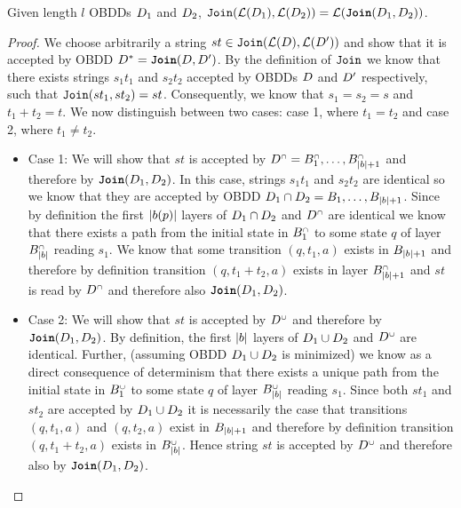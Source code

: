 \begin{lemma}
\label{lemma:SymbolicJoin}
Given length $l$ OBDDs $D_1$ and $D_2$, $\texttt{Join}(\mathcal{L}(D_1),\mathcal{L}(D_2)) = \mathcal{L}(\texttt{\textbf{Join}}(D_1,D_2))$.
\end{lemma}

\begin{proof}
    We choose arbitrarily a  string $st \in \texttt{Join}(\mathcal{L}(D),\mathcal{L}(D'))$ and show that it is accepted by OBDD $D^* = \texttt{\textbf{Join}}(D,D')$.
    By the definition of $\texttt{Join}$ we know that there exists strings $s_1t_1$ and $s_2t_2$ accepted by OBDDs $D$ and $D'$ respectively, such that $\texttt{Join}(st_1,st_2) = st$. Consequently, we know that $s_1 = s_2 = s$ and $t_1 +t_2 = t$. We now distinguish between two cases: case 1, where $t_1 = t_2$ and case 2, where $t_1 \neq t_2$.
    \begin{itemize}
        \item Case 1: We will show that $st$ is accepted by $D^{\scriptscriptstyle\cap} = B_1^{{\scriptscriptstyle\cap}},\ldots,B_{|b|+1}^{{\scriptscriptstyle\cap}}$ and therefore by $\texttt{\textbf{Join}}(D_1,D_2)$. In this case, strings $s_1t_1$ and $s_2t_2$ are identical so we know that they are accepted by OBDD $D_1 \cap D_2 = B_1,\ldots,B_{|b|+1}$. Since by definition the first $|b(p)|$ layers of $D_1 \cap D_2$ and $D^{\scriptscriptstyle\cap}$ are identical we know that there exists a path from the initial state in $B^{\scriptscriptstyle\cap}_1$ to some state $q$ of layer $B_{|b|}^{\scriptscriptstyle\cap}$ reading $s_1$. We know that some transition $(q,t_1,a)$ exists in $B_{|b|+1}$ and therefore by definition transition $(q,t_1+t_2,a)$ exists in layer $B_{|b|+1}^{\scriptscriptstyle\cap}$ and $st$ is read by $D^{\scriptscriptstyle\cap}$ and therefore also $\texttt{\textbf{Join}}(D_1,D_2)$.
        
        \item Case 2: We will show that $st$ is accepted by $D^{\scriptscriptstyle\cup}$ and therefore by $\texttt{\textbf{Join}}(D_1,D_2)$. By definition, the first $|b|$ layers of $D_1 \cup D_2$ and $D^{\scriptscriptstyle\cup}$ are identical. Further, (assuming OBDD $D_1 \cup D_2$ is minimized) we know as a direct consequence of determinism that there exists a unique path from the initial state in $B^{\scriptscriptstyle\cup}_1$ to some state $q$ of layer $B_{|b|}^{\scriptscriptstyle\cup}$ reading $s_1$. Since both $st_1$ and $st_2$ are accepted by $D_1 \cup D_2$ it is necessarily the case that transitions $(q, t_1, a)$ and $(q,t_2,a)$ exist in $B_{|b|+1}$ and therefore by definition transition $(q,t_1 + t_2,a)$ exists in $B_{|b|}^{\scriptscriptstyle\cup}$. Hence string $st$ is accepted by $D^{\scriptscriptstyle\cup}$ and therefore also by $\texttt{\textbf{Join}}(D_1,D_2)$.
    \end{itemize}


\end{proof}
